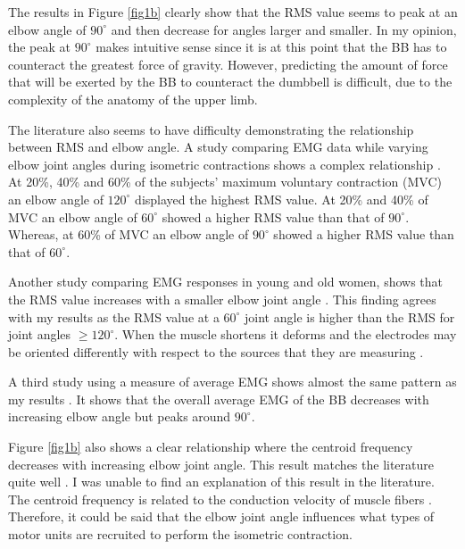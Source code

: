 \documentclass[11pt]{article}
\numberwithin{equation}{section}	%
\begin{document}
The results in Figure \ref{fig1b} clearly show that the RMS value seems to peak at an elbow angle of \(90^\circ\) and then decrease for angles larger and smaller. In my opinion, the peak at \(90^\circ\) makes intuitive sense since it is at this point that the BB has to counteract the greatest force of gravity. However, predicting the amount of force that will be exerted by the BB to counteract the dumbbell is difficult, due to the complexity of the anatomy of the upper limb. 

The literature also seems to have difficulty demonstrating the relationship between RMS and elbow angle. A study comparing EMG data while varying elbow joint angles during isometric contractions shows a complex relationship \cite{Mamaghani2002}. At 20\%, 40\% and 60\% of the subjects' maximum voluntary contraction (MVC) an elbow angle of \(120^\circ\) displayed the highest RMS value. At 20\% and 40\% of MVC an elbow angle of \(60^\circ\) showed a higher RMS value than that of \(90^\circ\). Whereas, at 60\% of MVC an elbow angle of \(90^\circ\) showed a higher RMS value than that of \(60^\circ\). 

Another study comparing EMG responses in young and old women, shows that the RMS value increases with a smaller elbow joint angle \cite{Jaskolska2006}. This finding agrees with my results as the RMS value at a \(60^\circ\) joint angle is higher than the RMS for joint angles \(\geq 120^\circ\). When the muscle shortens it deforms and the electrodes may be oriented differently with respect to the sources that they are measuring \cite{Jaskolska2006}. 

A third study using a measure of average EMG shows almost the same pattern as my results \cite{Linnamo2006}. It shows that the overall average EMG of the BB decreases with increasing elbow angle but peaks around \(90^\circ\).

Figure \ref{fig1b} also shows a clear relationship where the centroid frequency decreases with increasing elbow joint angle. This result matches the literature quite well \cite{Mamaghani2002}. I was unable to find an explanation of this result in the literature. The centroid frequency is related to the conduction velocity of muscle fibers \cite{Arendt-Nielsen1989}. Therefore, it could be said that the elbow joint angle influences what types of motor units are recruited to perform the isometric contraction.


\end{document}
